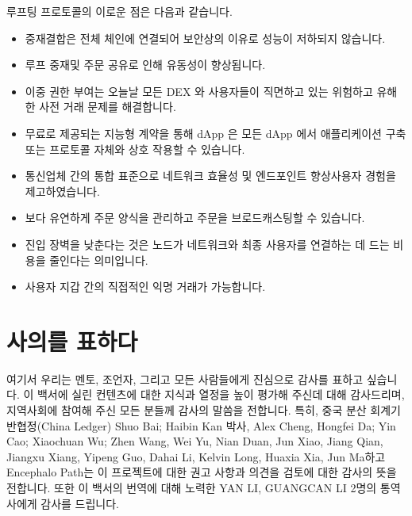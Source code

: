 \documentclass{article}
\begin{document}
\begin{multicols}{2}
\indent 루프팅 프로토콜의 이로운 점은 다음과 같습니다.

\begin{itemize}
      \item 중재결합은  전체 체인에 연결되어 보안상의 이유로 성능이 저하되지 않습니다.
      \item 루프 중재및 주문 공유로 인해 유동성이 향상됩니다.
      \item 이중 권한 부여는 오늘날 모든 DEX 와 사용자들이 직면하고 있는 위험하고 유해한 사전 거래 문제를 해결합니다.
      \item 무료로 제공되는 지능형 계약을 통해 dApp 은 모든 dApp 에서 애플리케이션 구축 또는 프로토콜 자체와 상호 작용할 수 있습니다.
      \item 통신업체 간의 통합 표준으로 네트워크 효율성 및 엔드포인트 향상사용자 경험을 제고하였습니다.
      \item 보다 유연하게 주문 양식을 관리하고 주문을 브로드캐스팅할 수 있습니다.
      \item 진입 장벽을 낮춘다는 것은 노드가 네트워크와 최종 사용자를 연결하는 데 드는 비용을 줄인다는 의미입니다.
      \item 사용자 지갑 간의 직접적인 익명 거래가 가능합니다.
\end{itemize}

\section{사의를 표하다}
\indent 여기서 우리는 멘토, 조언자, 그리고 모든 사람들에게 진심으로 감사를 표하고 싶습니다. 이 백서에 실린 컨텐츠에 대한 지식과 열정을 높이 평가해 주신데 대해 감사드리며, 지역사회에 참여해 주신 모든 분들께 감사의 말씀을 전합니다. 특히, 중국 분산 회계기반협정(China Ledger) Shuo Bai; Haibin Kan 박사, Alex Cheng, Hongfei Da; Yin Cao; Xiaochuan Wu; Zhen Wang, Wei Yu, Nian Duan, Jun Xiao, Jiang Qian, Jiangxu Xiang, Yipeng Guo, Dahai Li, Kelvin Long, Huaxia Xia, Jun Ma하고 Encephalo Path는 이 프로젝트에 대한 권고 사항과 의견을 검토에 대한 감사의 뜻을 전합니다.  또한 이 백서의  번역에 대해 노력한 YAN LI, GUANGCAN LI 2명의 통역사에게 감사를 드립니다.






\end{multicols}
\end{document}
